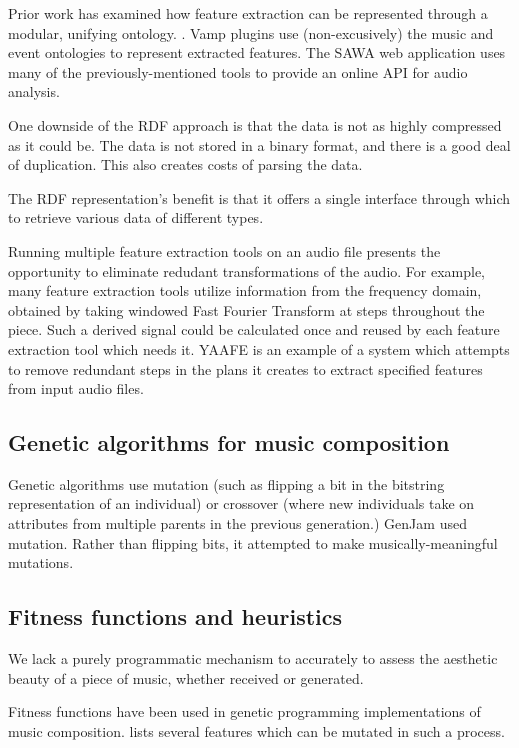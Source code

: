 \documentclass[11pt,conference,letterpaper]{IEEEtran}
\begin{document}
Prior work has examined how feature extraction can be represented through a modular, unifying ontology. \cite{raimond2008web}. Vamp plugins use (non-excusively) the music \cite{raimond2007music} and event \cite{raimond2007event} ontologies to represent extracted features. The SAWA web application \cite{fazekas2009reusable} uses many of the previously-mentioned tools to provide an online API for audio analysis.

One downside of the RDF approach is that the data is not as highly compressed as it could be. The data is not stored in a binary format, and there is a good deal of duplication. This also creates costs of parsing the data.

The RDF representation's benefit is that it offers a single interface through which to retrieve various data of different types.

Running multiple feature extraction tools on an audio file presents the opportunity to eliminate redudant transformations of the audio. For example, many feature extraction tools utilize information from the frequency domain, obtained by taking windowed Fast Fourier Transform at steps throughout the piece. Such a derived signal could be calculated once and reused by each feature extraction tool which needs it. YAAFE \cite{mathieu2010yaafe} is an example of a system which attempts to remove redundant steps in the plans it creates to extract specified features from input audio files.

\subsection{Genetic algorithms for music composition}

Genetic algorithms use mutation (such as flipping a bit in the bitstring representation of an individual) or crossover (where new individuals take on attributes from multiple parents in the previous generation.) GenJam used mutation. Rather than flipping bits, it attempted to make musically-meaningful mutations.

\subsection{Fitness functions and heuristics}

We lack a purely programmatic mechanism to accurately to assess the aesthetic beauty of a piece of music, whether received or generated.

Fitness functions have been used in genetic programming implementations of music composition. \cite{towsey2001towards} lists several features which can be mutated in such a process.
\end{document}
